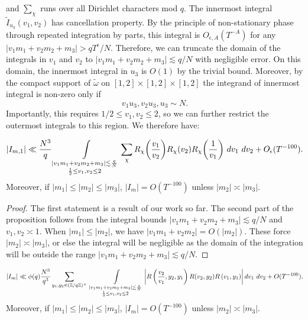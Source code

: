and $\sum_\chi$ runs over all Dirichlet characters mod $q$.
The innermost integral $\tilde{I}_{u_3}(v_1,v_2)$ has cancellation property. By the principle of non-stationary phase through repeated integration by parts, this integral is $O_{\epsilon, A}(T^{-A})$ for any $|v_1m_1+v_2m_2+m_3|>qT^\epsilon/N$. Therefore, we can truncate the domain of the integrals in $v_1$ and $v_2$ to  $|v_1m_1+v_2m_2+m_3|\lesssim q/N$ with negligible error. On this domain, the innermost integral in $u_3$ is $O(1)$ by the trivial bound. Moreover, by the compact support of $\tilde{\omega}$ on $[1,2]\times [1,2]\times [1,2]$  the integrand of innermost integral is non-zero only if \[
v_1u_3,v_2u_3,u_3\sim N.
\]
Importantly, this requires $1/2 \leq v_1,v_2 \leq 2$, so we can further restrict the outermost integrals to this region. 
We therefore have: 
\begin{proposition} \label{betterboundsplit}
    \[
    |I_{m,1}|\ll \frac{N^3}{q}\int\displaylimits_{\substack{
        |v_1m_1+v_2m_2+m_3|\lesssim \frac{q}{N}\\
        \frac{1}{2}\leq v_1,v_2\leq 2
}} \sum_{\chi} R_{\chi}{\left(\frac{v_1}{v_2}\right)}R_{\chi} {\left(v_2\right)}R_{\chi}{\left(\frac{1}{v_1}\right)} \ dv_1\ dv_2+O_{\epsilon}(T^{-100}).
    \]
    Moreover, if $|m_1|\leq|m_2|\leq |m_3|$, $|I_m|=O(T^{-100})$ unless $|m_2|\asymp|m_3|$.
\end{proposition}
\begin{proof}
    The first statement is a result of our work so far. The second part of the proposition follows from the integral bounds $|v_1m_1+v_2m_2+m_3|\lesssim q/N$
    and $v_1,v_2\asymp 1$. When $|m_1|\leq |m_2|$, we have $|v_1m_1+v_2m_2|=O(|m_2|)$. These force $|m_2| \asymp|m_3|$, or else the integral will be negligible as the domain of the integration will be outside the range $|v_1m_1+v_2m_2+m_3|\lesssim q/N$.
\end{proof}
    \iffalse
    \begin{proposition}
        \label{doubleintegrals3}
        \[
        |I_m|\ll \phi(q) \frac{N^3}{q^3}  
        \sum_{y_1,y_2\in (\mathbb{Z}/q\mathbb{Z})^\times}\ \int\displaylimits_{\substack{
            |v_1m_1+v_2m_2+m_3|\lesssim \frac{q}{N}\\
            \frac{1}{2}\leq v_1,v_2\leq 2
        }} \left| R\left(\frac{v_2}{v_1},y_2,y_1\right)
        R(v_2,y_2)R\left(v_1,y_1\right)\right| dv_1 \ dv_2  + O(T^{-100}).\\
        \]
        Moreover, if $|m_1|\leq|m_2|\leq |m_3|$, $|I_m|=O(T^{-100})$ unless $|m_2|\asymp|m_3|$.
    \end{proposition}
